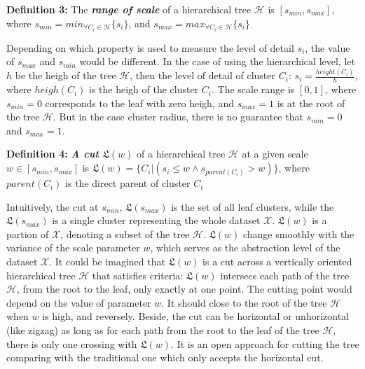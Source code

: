 \textbf{Definition 3:} The \textbf{\textit{range of scale}} of a hierarchical tree $\mathcal{H}$ is $[s_{min},s_{max}]$, where $s_{min} = min_{\forall C_i \in \mathcal{H}}\{s_i\}$, and $s_{max} = max_{\forall C_i \in \mathcal{H}}\{s_i\}$

Depending on which property is used to measure the level of detail $s_i$, the value of  $s_{max}$ and  $s_{min}$ would be different. In the case of using the hierarchical level, let $h$ be the heigh of the tree $\mathcal{H}$, then the level of detail of cluster $C_i$: $s_i = \frac{height(C_i)}{h}$, where $heigh(C_i)$ is the heigh of the cluster $C_i$. The scale range is $[0,1]$, where $s_{min} = 0$ corresponds to the leaf with zero heigh, and $s_{max} = 1$ is at the root of the tree $\mathcal{H}$. But in the case cluster radius, there is no guarantee that $s_{min} = 0$ and $s_{max} = 1$.

\textbf{Definition 4:} \textbf{\textit{A cut $\mathfrak{L}(w)$}} of a hierarchical tree $\mathcal{H}$ at a given scale $w \in [s_{min},s_{max}] $  is $\mathfrak{L}(w) = \{C_i | (s_i \leq w  \wedge s_{parent(C_i)} > w)\}$, where $parent(C_i)$ is the direct parent of cluster $C_i$

Intuitively, the cut at $s_{min}$, $\mathfrak{L}(s_{max})$ is the set of all leaf clusters, while the $\mathfrak{L}(s_{max})$ is a single cluster representing the whole dataset $\mathcal{X}$. $\mathfrak{L}(w)$ is a partion of $\mathcal{X}$, denoting a subset of the tree $\mathcal{H}$. $\mathfrak{L}(w)$ change smoothly with the variance of the scale parameter $w$, which serves as the abstraction level of the dataset $\mathcal{X}$. It could be imagined that $\mathfrak{L}(w)$ is a cut across a vertically oriented hierarchical tree $\mathcal{H}$ that satisfies criteria: $\mathfrak{L}(w)$ intersecs each path of the tree $\mathcal{H}$, from the root to the leaf, only exactly at one point. The cutting point would depend on the value of parameter $w$. It should close to the root of the tree $\mathcal{H}$ when $w$ is high, and reversely. Beside, the cut can be horizontal or unhorizontal (like zigzag) as long as for each path from the root to the leaf of the tree $\mathcal{H}$, there is only one crossing with $\mathfrak{L}(w)$. It is an open approach for cutting the tree comparing with the traditional one which only accepts the horizontal cut. 

